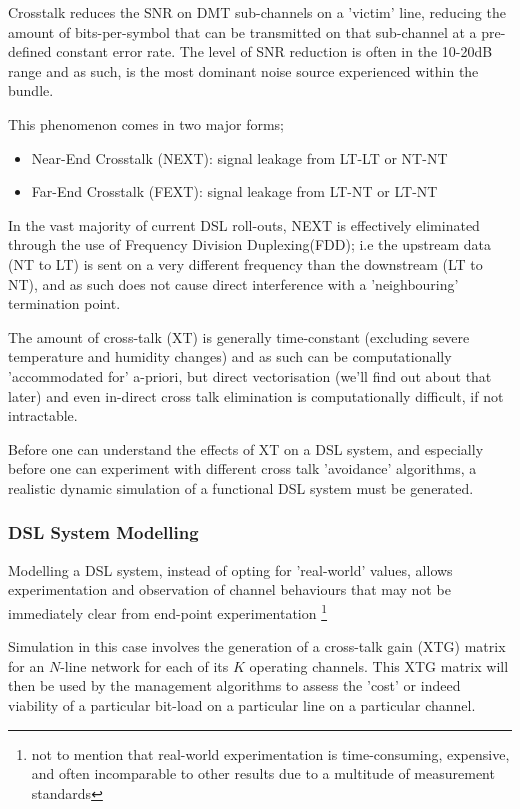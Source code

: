 Crosstalk reduces the SNR on DMT sub-channels on a 'victim' line, reducing the amount of bits-per-symbol that can be transmitted on that sub-channel at a pre-defined constant error rate. The level of SNR reduction is often in the 10-20dB range and as such, is the most dominant noise source experienced within the bundle.\cite{RC04}

This phenomenon comes in two major forms; 
\begin{itemize}
  \item Near-End Crosstalk (NEXT): signal leakage from LT-LT or NT-NT
  \item Far-End Crosstalk (FEXT): signal leakage from LT-NT or LT-NT
\end{itemize}

In the vast majority of current DSL roll-outs, NEXT is effectively eliminated through the use of Frequency Division Duplexing(FDD); i.e the upstream data (NT to LT) is sent on a very different frequency than the downstream (LT to NT), and as such does not cause direct interference with a 'neighbouring' termination point.

The amount of cross-talk (XT) is generally time-constant (excluding severe temperature and humidity changes) and as such can be computationally 'accommodated for' a-priori, but direct vectorisation (we'll find out about that later) and even in-direct cross talk elimination is computationally difficult, if not intractable.

Before one can understand the effects of XT on a DSL system, and especially before one can experiment with different cross talk 'avoidance' algorithms, a realistic dynamic simulation of a functional DSL system must be generated. 

\subsubsection{DSL System Modelling}
Modelling a DSL system, instead of opting for 'real-world' values, allows experimentation and observation of channel behaviours that may not be immediately clear from end-point experimentation \footnote{not to mention that real-world experimentation is time-consuming, expensive, and often incomparable to other results due to a multitude of measurement standards}

Simulation in this case involves the generation of a cross-talk gain (XTG) matrix for an \(N\)-line network for each of its \(K\) operating channels. This XTG matrix will then be used by the management algorithms to assess the 'cost' or indeed viability of a particular bit-load on a particular line on a particular channel.

